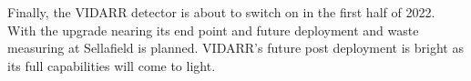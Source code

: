 \\\\Finally, the VIDARR detector is about to switch on in the first half of 2022. With the upgrade nearing its end point and future deployment and waste measuring at Sellafield is planned. VIDARR's future post deployment is bright as its full capabilities will come to light. 
